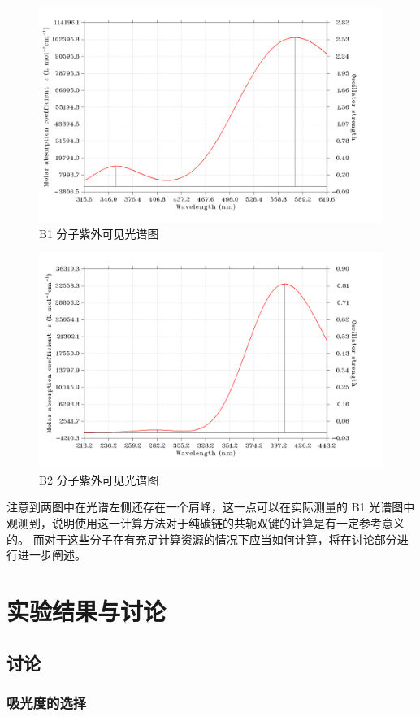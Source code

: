 \documentclass[cn,hazy,pku,12pt,normal,math=newtx,cite=super]{elegantnote}
\begin{document}
\begin{figure}[htbp]
    \centering
    \includegraphics[width = .70\textwidth]{image/B1.png}
    \caption{B1 分子紫外可见光谱图}\label{b1}
\end{figure}
\begin{figure}[htbp]
    \centering
    \includegraphics[width = .70\textwidth]{image/B2.png}
    \caption{B2 分子紫外可见光谱图}\label{b2}
\end{figure}

注意到两图中在光谱左侧还存在一个肩峰，这一点可以在实际测量的 B1 光谱图中观测到，说明使用这一计算方法对于纯碳链的共轭双键的计算是有一定参考意义的。
而对于这些分子在有充足计算资源的情况下应当如何计算，将在讨论部分进行进一步阐述。



\section{实验结果与讨论}

\subsection{讨论}

\subsubsection{吸光度的选择}
\end{document}
